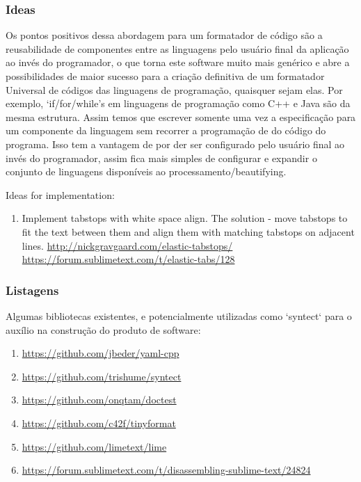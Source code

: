 \begin{englishtext}
\subsubsection{Ideas}

    Os pontos positivos dessa abordagem para um formatador de código são a reusabilidade de
    componentes entre as linguagens pelo usuário final da aplicação ao invés do programador, o que
    torna este software muito mais genérico e abre a possibilidades de maior sucesso para a criação
    definitiva de um formatador Universal de códigos das linguagens de programação, quaisquer sejam
    elas. Por exemplo, `if/for/while'\textquotesingle s em linguagens de programação como C++ e Java
    são da mesma estrutura. Assim temos que escrever somente uma vez a especificação para um
    componente da linguagem sem recorrer a programação de do código do programa. Isso tem a vantagem
    de por der ser configurado pelo usuário final ao invés do programador, assim fica mais simples
    de configurar e expandir o conjunto de linguagens disponíveis ao processamento/beautifying.

    Ideas for implementation:

\medskip
\begin{bluebox}
\begin{enumerate}[leftmargin=*]

    \item Implement tabstops with white space align. The solution - move
    tabstops to fit the text between them and align them with matching tabstops
    on adjacent lines. \url{http://nickgravgaard.com/elastic-tabstops/}
    \url{https://forum.sublimetext.com/t/elastic-tabs/128}

\end{enumerate}
\end{bluebox}


\subsubsection{Listagens}

    Algumas bibliotecas existentes, e potencialmente utilizadas como `syntect` para o auxílio na
    construção do produto de software:

    \begin{bluebox}
    \begin{enumerate}[leftmargin=*,parsep=0pt]

        \item \url{https://github.com/jbeder/yaml-cpp}
        \item \url{https://github.com/trishume/syntect}
        \item \url{https://github.com/onqtam/doctest}
        \item \url{https://github.com/c42f/tinyformat}
        \item \url{https://github.com/limetext/lime}
        \item \url{https://forum.sublimetext.com/t/disassembling-sublime-text/24824}


\end{enumerate}
\end{bluebox}
\end{englishtext}
